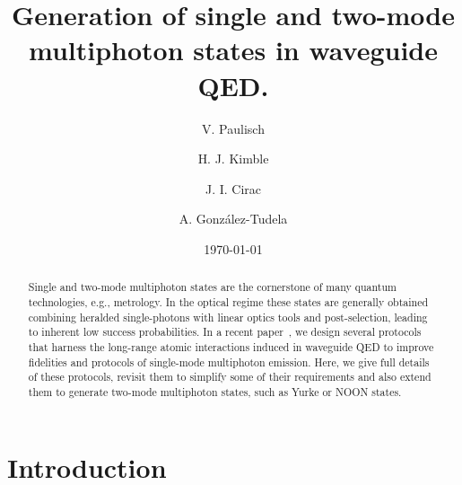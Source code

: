 \documentclass[twocolumn,pra,aps,superscriptaddress,showpacs]{revtex4-1}
\begin{document}
\title{Generation of single and two-mode multiphoton states in waveguide QED.}

\author{V. Paulisch}

\author{H. J. Kimble}

\author{J. I. Cirac}

\author{A. Gonz\'{a}lez-Tudela}

\date{\today}

\begin{abstract}
Single and two-mode multiphoton states are the cornerstone of many quantum technologies, e.g., metrology. In the optical regime these states are generally obtained combining heralded single-photons with linear optics tools and post-selection, leading to inherent low success probabilities. In a recent paper~\cite{gonzaleztudela17a}, we design several protocols that harness the long-range atomic interactions induced in waveguide QED to improve fidelities and protocols of single-mode multiphoton emission. Here, we give full details of these protocols, revisit them to simplify some of their requirements and also extend them to generate two-mode multiphoton states, such as Yurke or NOON states.
\end{abstract}
 
\maketitle

\section{Introduction}\label{sec:intro}
\end{document}

